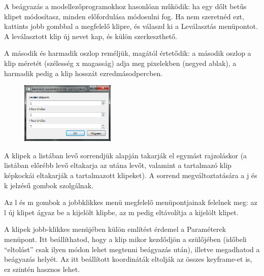 \documentclass[a4paper,12pt,release]{article}
\begin{document}
A beágyazás a modellezőprogramokhoz hasonlóan működik: ha egy dőlt betűs klipet módosítasz, minden előfordulása módosulni fog. Ha nem szeretnéd ezt, kattints jobb gombbal a megfelelő klipre, és válaszd ki a Leválasztás menüpontot. A leválasztott klip új nevet kap, és külön szerkeszthető.

A második és harmadik oszlop reméljük, magától értetődik: a második oszlop a klip méretét (szélesség x magasság) adja meg pixelekben (negyed ablak), a harmadik pedig a klip hosszát ezredmásodpercben.

\begin{figure}
	\vspace{-27pt}
	\begin{center}
		\includegraphics[width=0.4\textwidth]{pics/childsettings.png}
	\end{center}
	\vspace{-27pt}
\end{figure}
A klipek a listában levő sorrendjük alapján takarják el egymást rajzoláskor (a listában előrébb levő eltakarja az utána levőt, valamint a tartalmazó klip képkockái eltakarják a tartalmazott klipeket). A sorrend megváltoztatására a j és k jelzésű gombok szolgálnak.

Az l és m gombok a jobbklikkes menü megfelelő menüpontjainak felelnek meg: az l új klipet ágyaz be a kijelölt klipbe, az m pedig eltávolítja a kijelölt klipet.

A klipek jobb-klikkes menüjében külön említést érdemel a Paraméterek menüpont. Itt beállíthatod, hogy a klip mikor kezdődjön a szülőjében (időbeli ``eltolást'' csak ilyen módon lehet megtenni beágyazás után), illetve megadhatod a beágyazás helyét. Az itt beállított koordináták eltolják az összes keyframe-et is, ez szintén hasznos lehet.
\end{document}
